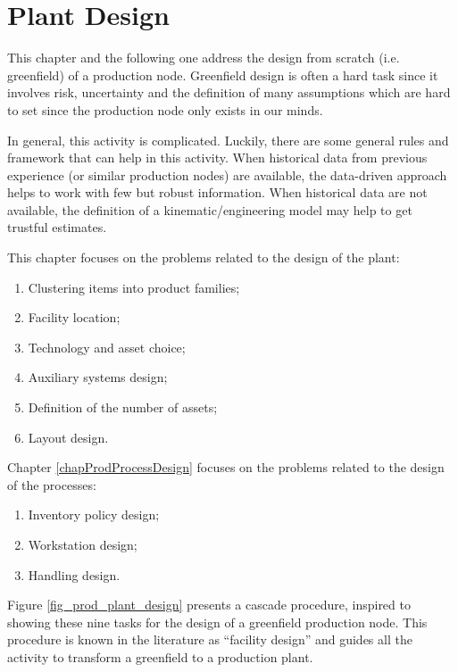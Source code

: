 \chapter{Plant Design} \label{chapProdPlantDesign}

This chapter and the following one address the design from scratch (i.e. greenfield) of a production node. Greenfield design is often a hard task since it involves risk, uncertainty and the definition of many assumptions which are hard to set since the production node only exists in our minds.\par

In general, this activity is complicated. Luckily, there are some general rules and framework that can help in this activity. When historical data from previous experience (or similar production nodes) are available, the data-driven approach helps to work with few but robust information. When historical data are not available, the definition of a kinematic/engineering model may help to get trustful estimates.\par

This chapter focuses on the problems related to the design of the plant:

\begin{enumerate}
    \item Clustering items into product families;
    \item Facility location;
    \item Technology and asset choice;
    \item Auxiliary systems design;
    \item Definition of the number of assets;
    \item Layout design.

\end{enumerate}

Chapter \ref{chapProdProcessDesign} focuses on the problems related to the design of the processes:

\begin{enumerate}
    \item Inventory policy design;
    \item Workstation design;
    \item Handling design.

\end{enumerate}

Figure \ref{fig_prod_plant_design} presents a cascade procedure, inspired to ~\cite{Heragu} showing these nine tasks for the design of a greenfield production node. This procedure is known in the literature as “facility design” and guides all the activity to transform a greenfield to a production plant.

